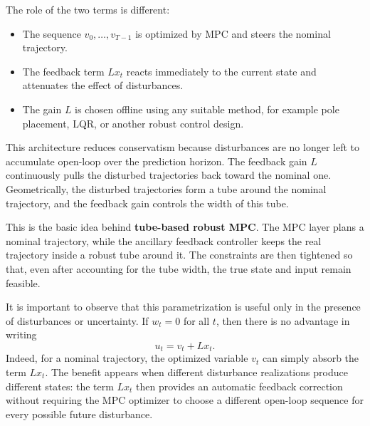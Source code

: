 The role of the two terms is different:

\begin{itemize}
    \item The sequence $v_0,\dots,v_{T-1}$ is optimized by MPC and steers the nominal
    trajectory.

    \item The feedback term $Lx_t$ reacts immediately to the current state and attenuates
    the effect of disturbances.

    \item The gain $L$ is chosen offline using any suitable method, for example pole placement,
    LQR, or another robust control design.
\end{itemize}

This architecture reduces conservatism because disturbances are no longer left to accumulate
open-loop over the prediction horizon. The feedback gain $L$ continuously pulls the disturbed
trajectories back toward the nominal one. Geometrically, the disturbed trajectories form a
tube around the nominal trajectory, and the feedback gain controls the width of this tube.

This is the basic idea behind \textbf{tube-based robust MPC}. The MPC layer plans a nominal
trajectory, while the ancillary feedback controller keeps the real trajectory inside a robust tube
around it. The constraints are then tightened so that, even after accounting for the tube width,
the true state and input remain feasible.

It is important to observe that this parametrization is useful only in the presence of
disturbances or uncertainty. If $w_t=0$ for all $t$, then there is no advantage in writing
\[
u_t=v_t+Lx_t.
\]
Indeed, for a nominal trajectory, the optimized variable $v_t$ can simply absorb the term
$Lx_t$. The benefit appears when different disturbance realizations produce different states:
the term $Lx_t$ then provides an automatic feedback correction without requiring the MPC
optimizer to choose a different open-loop sequence for every possible future disturbance.